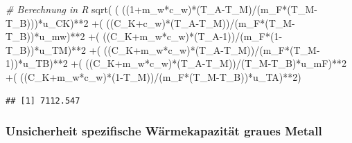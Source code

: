 \documentclass[
  9pt,
]{article}
\newenvironment{Shaded}{\begin{snugshade}}{\end{snugshade}}
\newcommand{\CommentTok}[1]{\textcolor[rgb]{0.56,0.35,0.01}{\textit{#1}}}
\newcommand{\DecValTok}[1]{\textcolor[rgb]{0.00,0.00,0.81}{#1}}
\newcommand{\FunctionTok}[1]{\textcolor[rgb]{0.00,0.00,0.00}{#1}}
\newcommand{\NormalTok}[1]{#1}
\newcommand{\SpecialCharTok}[1]{\textcolor[rgb]{0.00,0.00,0.00}{#1}}
\begin{document}
\begin{Shaded}
\begin{Highlighting}[]
\CommentTok{\# Berechnung in R}
\FunctionTok{sqrt}\NormalTok{( ( ((}\DecValTok{1}\SpecialCharTok{+}\NormalTok{m\_w}\SpecialCharTok{*}\NormalTok{c\_w)}\SpecialCharTok{*}\NormalTok{(T\_A}\SpecialCharTok{{-}}\NormalTok{T\_M)}\SpecialCharTok{/}\NormalTok{(m\_F}\SpecialCharTok{*}\NormalTok{(T\_M}\SpecialCharTok{{-}}\NormalTok{T\_B)))}\SpecialCharTok{*}\NormalTok{u\_CK)}\SpecialCharTok{**}\DecValTok{2}
     \SpecialCharTok{+}\NormalTok{( ((C\_K}\SpecialCharTok{+}\NormalTok{c\_w)}\SpecialCharTok{*}\NormalTok{(T\_A}\SpecialCharTok{{-}}\NormalTok{T\_M))}\SpecialCharTok{/}\NormalTok{(m\_F}\SpecialCharTok{*}\NormalTok{(T\_M}\SpecialCharTok{{-}}\NormalTok{T\_B))}\SpecialCharTok{*}\NormalTok{u\_mw)}\SpecialCharTok{**}\DecValTok{2}
     \SpecialCharTok{+}\NormalTok{( ((C\_K}\SpecialCharTok{+}\NormalTok{m\_w}\SpecialCharTok{*}\NormalTok{c\_w)}\SpecialCharTok{*}\NormalTok{(T\_A}\DecValTok{{-}1}\NormalTok{))}\SpecialCharTok{/}\NormalTok{(m\_F}\SpecialCharTok{*}\NormalTok{(}\DecValTok{1}\SpecialCharTok{{-}}\NormalTok{T\_B))}\SpecialCharTok{*}\NormalTok{u\_TM)}\SpecialCharTok{**}\DecValTok{2}
     \SpecialCharTok{+}\NormalTok{( ((C\_K}\SpecialCharTok{+}\NormalTok{m\_w}\SpecialCharTok{*}\NormalTok{c\_w)}\SpecialCharTok{*}\NormalTok{(T\_A}\SpecialCharTok{{-}}\NormalTok{T\_M))}\SpecialCharTok{/}\NormalTok{(m\_F}\SpecialCharTok{*}\NormalTok{(T\_M}\DecValTok{{-}1}\NormalTok{))}\SpecialCharTok{*}\NormalTok{u\_TB)}\SpecialCharTok{**}\DecValTok{2}
     \SpecialCharTok{+}\NormalTok{( ((C\_K}\SpecialCharTok{+}\NormalTok{m\_w}\SpecialCharTok{*}\NormalTok{c\_w)}\SpecialCharTok{*}\NormalTok{(T\_A}\SpecialCharTok{{-}}\NormalTok{T\_M))}\SpecialCharTok{/}\NormalTok{(T\_M}\SpecialCharTok{{-}}\NormalTok{T\_B)}\SpecialCharTok{*}\NormalTok{u\_mF)}\SpecialCharTok{**}\DecValTok{2}
     \SpecialCharTok{+}\NormalTok{( ((C\_K}\SpecialCharTok{+}\NormalTok{m\_w}\SpecialCharTok{*}\NormalTok{c\_w)}\SpecialCharTok{*}\NormalTok{(}\DecValTok{1}\SpecialCharTok{{-}}\NormalTok{T\_M))}\SpecialCharTok{/}\NormalTok{(m\_F}\SpecialCharTok{*}\NormalTok{(T\_M}\SpecialCharTok{{-}}\NormalTok{T\_B))}\SpecialCharTok{*}\NormalTok{u\_TA)}\SpecialCharTok{**}\DecValTok{2}\NormalTok{)}
\end{Highlighting}
\end{Shaded}

\begin{verbatim}
## [1] 7112.547
\end{verbatim}

\hypertarget{unsicherheit-spezifische-wuxe4rmekapazituxe4t-graues-metall}{%
\subsubsection{Unsicherheit spezifische Wärmekapazität graues
Metall}\label{unsicherheit-spezifische-wuxe4rmekapazituxe4t-graues-metall}}
\end{document}
